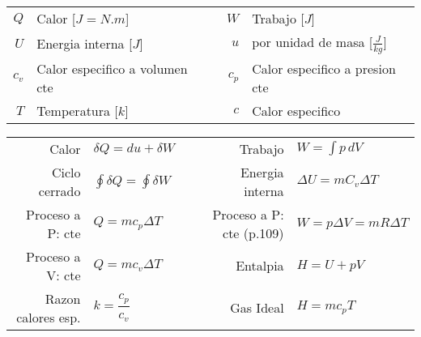 \documentclass[a4paper, 11pt,titlepage]{book}
\begin{document}
	\begin{tcolorbox}[title = \large\textbf{Primer Principio}]
	
	\begin{tabular}{r l c r l}
		$Q$ & Calor [$J = N.m$]& \hspace{1cm} & $W $& Trabajo [$J$]\\
		$U$ & Energia interna [$J$] & & $u$ & por unidad de masa [$\frac{J}{kg}$]\\
		$c_v$ & Calor especifico a volumen cte & & $c_p$& Calor especifico a presion cte\\
		$T$ & Temperatura [$k$] && $c$ & Calor especifico
	\end{tabular} 

	\begin{center}
			\begin{tabular}{r | l c r | l}
					\vspace{0.3cm} Calor & $\delta Q = du + \delta W$ && Trabajo & $W = \int{p \, dV}$   \\ 
					\vspace{0.3cm} Ciclo cerrado  & $\oint{\delta Q} = \oint{\delta W} $ && Energia interna  & $\Delta U =m C_v\Delta T$\\ 
					\vspace{0.3cm} Proceso a P: cte & $Q = m c_p \Delta T$ &&  Proceso a P: cte (p.109) & $W = p \Delta V = mR \Delta T$\\ 
			     	\vspace{0.3cm} 	Proceso a V: cte & $Q = m c_v \Delta T$ && Entalpia & $H = U + pV$ \\ 
					Razon calores esp. & $k = \dfrac{c_p}{c_v}$ &&Gas Ideal & $H = m c_p T$
			\end{tabular}
		\end{center}
	\end{tcolorbox}
	

\end{document}
